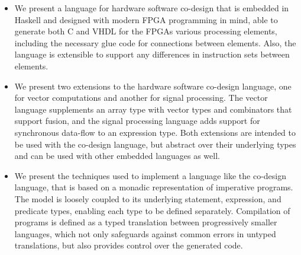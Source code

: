 \documentclass[../paper.tex]{subfiles}
\begin{document}
\begin{itemize}
\item We present a language for hardware software co-design that is embedded in Haskell and designed with modern FPGA programming in mind, able to generate both C and VHDL for the FPGAs various processing elements, including the necessary glue code for connections between elements. Also, the language is extensible to support any differences in instruction sets between elements.

\item We present two extensions to the hardware software co-design language, one for vector computations and another for signal processing. The vector language supplements an array type with vector types and combinators that support fusion, and the signal processing language adds support for synchronous data-flow to an expression type. Both extensions are intended to be used with the co-design language, but abstract over their underlying types and can be used with other embedded languages as well.

\item We present the techniques used to implement a language like the co-design language, that is based on a monadic representation of imperative programs. The model is loosely coupled to its underlying statement, expression, and predicate types, enabling each type to be defined separately. Compilation of programs is defined as a typed translation between progressively smaller languages, which not only safeguards against common errors in untyped translations, but also provides control over the generated code.

\end{itemize}
\end{document}
